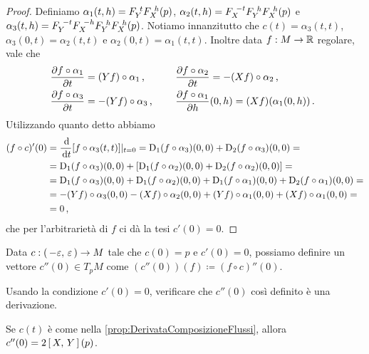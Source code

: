 \begin{proof}
	Definiamo $\alpha_1(t,h)=F_{Y}^{\ t}F_{X}^{\ h}(p)$, $\alpha_2(t,h)=F_{X}^{\ -t}F_{Y}^{\ h}F_{X}^{\ h}(p)$ e $\alpha_3(t,h)=F_{Y}^{\ -t}F_{X}^{\ -h}F_{Y}^{\ h}F_{X}^{\ h}(p)$. Notiamo innanzitutto che $c(t)=\alpha_3(t,t)$, $\alpha_3(0,t)=\alpha_2(t,t)$ e $\alpha_2(0,t)=\alpha_1(t,t)$.
	Inoltre data $f:M\to\mathbb R$ regolare, vale che
	\begin{alignat*}{2}
		&\frac{\partial f\circ\alpha_1}{\partial t}=(Yf)\circ\alpha_1 \, \text{, } \quad&&
		\frac{\partial f\circ \alpha_2}{\partial t} = -(Xf)\circ \alpha_2 \, \text{, }\\
		&\frac{\partial f\circ\alpha_3}{\partial t}=-(Yf)\circ\alpha_3 \, \text{, } \quad&&
		\frac{\partial f\circ\alpha_1}{\partial h}(0,h)=(Xf)(\alpha_1(0,h)) \, \text{. }
	\end{alignat*}
	Utilizzando quanto detto abbiamo
	\begin{align*}
	(f\circ c)'(0)&=\frac{\,\mathrm d}{\,\mathrm d t}[f\circ\alpha_3(t,t)]|_{t=0} =\mathrm D_1(f\circ \alpha_3)(0,0)+\mathrm D_2(f\circ\alpha_3)(0,0) =
	\\ &=\mathrm D_1(f\circ\alpha_3)(0,0)+\left[\mathrm D_1(f\circ\alpha_2)(0,0)+\mathrm D_2(f\circ\alpha_2)(0,0) \right] =
	\\ &=\mathrm D_1(f\circ\alpha_3)(0,0)+\mathrm D_1(f\circ\alpha_2)(0,0)+\mathrm D_1(f\circ\alpha_1)(0,0)+\mathrm D_2(f\circ\alpha_1)(0,0) =
	\\ &=-(Yf)\circ\alpha_3(0,0)-(Xf)\circ\alpha_2(0,0)+(Yf)\circ\alpha_1(0,0)+(Xf)\circ\alpha_1(0,0) =
	\\ &=0 \, \text{, }
	\end{align*}
	che per l'arbitrarietà di $f$ ci dà la tesi $c'(0)=0$.
\end{proof}

\begin{proposition} \label{prop:DefinizioneDerSeconda}
	Data $c:\left(\,-\varepsilon,\,\varepsilon\,\right)\to M$ tale che $c(0)=p$ e $c'(0)=0$, possiamo definire un vettore $c''(0)\in T_pM$ come $(c''(0))(f)\coloneqq(f\circ c)''(0)$.
\end{proposition}

\begin{exercise}
	Usando la condizione $c'(0)=0$, verificare che $c''(0)$  così definito è una derivazione.
\end{exercise}

\begin{theorem}
	Se $c(t)$ è come nella \cref{prop:DerivataComposizioneFlussi}, allora $c''(0)=2\left[\,X,\,Y\,\right](p)$.
\end{theorem}

